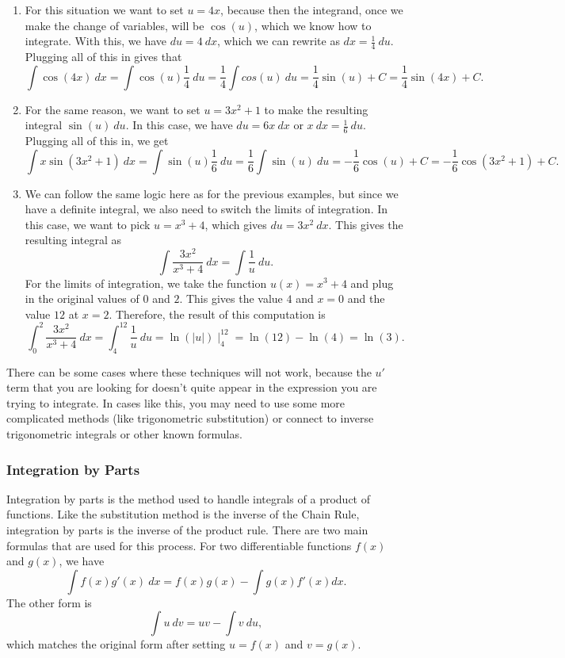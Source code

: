 \begin{exampleSol}
\begin{enumerate}
\item For this situation we want to set $u = 4x$, because then the integrand, once we make the change of variables, will be $\cos(u)$, which we know how to integrate. With this, we have $du = 4\ dx$, which we can rewrite as $dx = \frac{1}{4}\ du$. Plugging all of this in gives that
\[ \int \cos(4x)\ dx = \int \cos(u) \frac{1}{4}\ du = \frac{1}{4} \int cos(u)\ du = \frac{1}{4}\sin(u) + C = \frac{1}{4}\sin(4x) + C. \]
\item For the same reason, we want to set $u = 3x^2 + 1$ to make the resulting integral $\sin(u)\ du$. In this case, we have $du = 6x\  dx$ or $ x\ dx = \frac{1}{6}\ du$. Plugging all of this in, we get
\[ \int x\sin(3x^2 + 1)\ dx = \int \sin(u) \frac{1}{6}\ du = \frac{1}{6}\int \sin(u)\ du = -\frac{1}{6}\cos(u) + C = -\frac{1}{6}\cos(3x^2 + 1) + C. \]
\item We can follow the same logic here as for the previous examples, but since we have a definite integral, we also need to switch the limits of integration. In this case, we want to pick $u = x^3 + 4$, which gives $du = 3x^2\ dx$. This gives the resulting integral as \[ \int \frac{3x^2}{x^3 + 4}\ dx = \int \frac{1}{u}\ du. \] For the limits of integration, we take the function $u(x) = x^3 + 4$ and plug in the original values of $0$ and $2$. This gives the value $4$ and $x=0$ and the value $12$ at $x=2$. Therefore, the result of this computation is
\[  \int_0^2 \frac{3x^2}{x^3 + 4}\ dx = \int_4^{12} \frac{1}{u}\ du = \ln(|u|)\mid_4^{12} = \ln(12) - \ln(4) = \ln(3).\]
\end{enumerate}
\end{exampleSol} 

There can be some cases where these techniques will not work, because the $u'$ term that you are looking for doesn't quite appear in the expression you are trying to integrate. In cases like this, you may need to use some more complicated methods (like trigonometric substitution) or connect to inverse trigonometric integrals or other known formulas.


\subsubsection{Integration by Parts}

Integration by parts is the method used to handle integrals of a product of functions. Like the substitution method is the inverse of the Chain Rule, integration by parts is the inverse of the product rule. There are two main formulas that are used for this process. For two differentiable functions $f(x)$ and $g(x)$, we have 
\[ \int f(x) g'(x)\ dx = f(x)g(x) - \int g(x) f'(x) dx. \] The other form is 
\[ \int u\ dv = uv - \int v\ du, \] which matches the original form after setting $u = f(x)$ and $v = g(x)$. 

